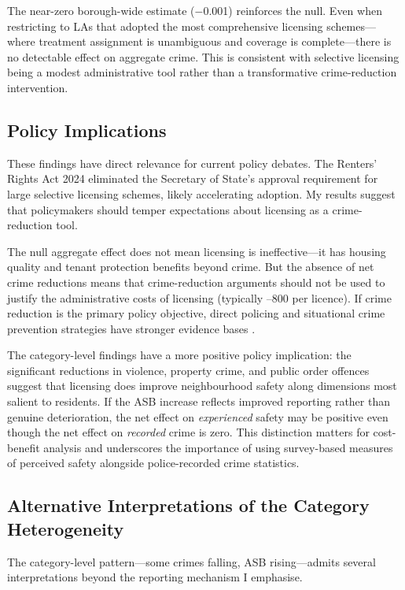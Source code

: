 \documentclass[12pt]{article}
\begin{document}
The near-zero borough-wide estimate ($-$0.001) reinforces the null. Even when restricting to LAs that adopted the most comprehensive licensing schemes---where treatment assignment is unambiguous and coverage is complete---there is no detectable effect on aggregate crime. This is consistent with selective licensing being a modest administrative tool rather than a transformative crime-reduction intervention.

\subsection{Policy Implications}

These findings have direct relevance for current policy debates. The Renters' Rights Act 2024 eliminated the Secretary of State's approval requirement for large selective licensing schemes, likely accelerating adoption. My results suggest that policymakers should temper expectations about licensing as a crime-reduction tool.

The null aggregate effect does not mean licensing is ineffective---it has housing quality and tenant protection benefits beyond crime. But the absence of net crime reductions means that crime-reduction arguments should not be used to justify the administrative costs of licensing (typically --800 per licence). If crime reduction is the primary policy objective, direct policing and situational crime prevention strategies have stronger evidence bases \citep{weisburd2006, guerette2009}.

The category-level findings have a more positive policy implication: the significant reductions in violence, property crime, and public order offences suggest that licensing does improve neighbourhood safety along dimensions most salient to residents. If the ASB increase reflects improved reporting rather than genuine deterioration, the net effect on \emph{experienced} safety may be positive even though the net effect on \emph{recorded} crime is zero. This distinction matters for cost-benefit analysis and underscores the importance of using survey-based measures of perceived safety alongside police-recorded crime statistics.

\subsection{Alternative Interpretations of the Category Heterogeneity}

The category-level pattern---some crimes falling, ASB rising---admits several interpretations beyond the reporting mechanism I emphasise.
\end{document}

